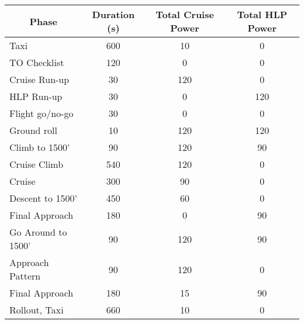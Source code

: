 \begin{tabular}{|l|c|c|c|}
\hline
 \multicolumn{1}{|c|}{\textbf{Phase}} &
\multicolumn{1}{c|}{\textbf{Duration (s)}} & 
\multicolumn{1}{c|}{\textbf{Total Cruise Power}} &
\multicolumn{1}{c|}{\textbf{Total HLP Power}}\\ 
\hline

\rowcolor{LightCyan}
Taxi           & 600 & 10 & 0 \\
TO Checklist   & 120 & 0 & 0 \\
\rowcolor{LightCyan}
Cruise Run-up   & 30 & 120 & 0 \\
HLP Run-up      & 30 & 0 & 120 \\
\rowcolor{LightCyan}
Flight go/no-go & 30 & 0 & 0 \\
Ground roll    & 10 & 120 & 120 \\
\rowcolor{LightCyan}
Climb to 1500' & 90 & 120 & 90 \\
Cruise Climb   & 540 & 120 & 0\\
\rowcolor{LightCyan}
Cruise         & 300 & 90 & 0 \\
Descent to 1500' & 450 & 60 & 0 \\
\rowcolor{LightCyan}
Final Approach & 180 & 0 & 90 \\
Go Around to 1500' & 90 & 120 & 90 \\
\rowcolor{LightCyan}
Approach Pattern & 90 & 120 & 0 \\
Final Approach & 180 & 15 & 90 \\
\rowcolor{LightCyan}
Rollout, Taxi  & 660 & 10 & 0 \\
\hline
\end{tabular}